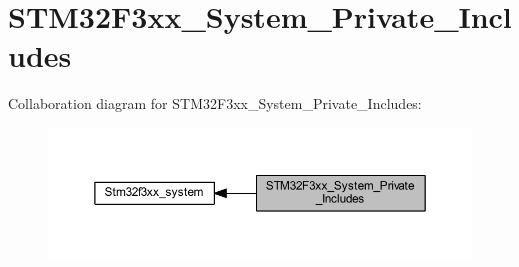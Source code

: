 \hypertarget{group___s_t_m32_f3xx___system___private___includes}{}\section{S\+T\+M32\+F3xx\+\_\+\+System\+\_\+\+Private\+\_\+\+Includes}
\label{group___s_t_m32_f3xx___system___private___includes}
Collaboration diagram for S\+T\+M32\+F3xx\+\_\+\+System\+\_\+\+Private\+\_\+\+Includes\+:\nopagebreak
\begin{figure}[H]
\begin{center}
\leavevmode
\includegraphics[width=350pt]{group___s_t_m32_f3xx___system___private___includes}
\end{center}
\end{figure}
